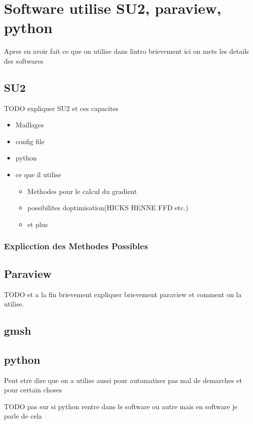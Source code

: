 \chapter{Software utilise SU2, paraview, python}

Apres en avoir fait ce que on utilise dans lintro brievement ici on mets les details des softwares

\section{SU2}
TODO expliquer SU2 et ces capacites
\begin{itemize}
    \item Maillages
    \item config file 
    \item python 
    \item ce que il utilise 
    \begin{itemize}
        \item Methodes pour le calcul du gradient
        \item possibilites doptimisation(HICKS HENNE FFD etc.)
        \item et plus 
    \end{itemize}
\end{itemize}

\subsection{Explicction des Methodes Possibles}


\section{Paraview}
TODO et a la fin brievement expliquer brievement paraview et comment on la utilise.

\section{gmsh}

\section{python}
Peut etre dire que on a utilise aussi pour automatiser pas mal de demarches et pour certain choses

TODO pas sur si python rentre dans le software ou autre mais en software je parle de cela 